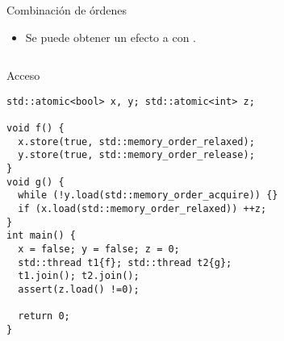 \begin{frame}[fragile]{Combinación de órdenes}
\begin{itemize}
\item Se puede obtener un efecto 
      a  con .
\end{itemize}
\begin{columns}

\begin{column}{.5\textwidth}
\begin{block}{Acceso}
\begin{lstlisting}[basicstyle=\tiny]
std::atomic<bool> x, y; std::atomic<int> z;

void f() {
  x.store(true, std::memory_order_relaxed);
  y.store(true, std::memory_order_release);
}
void g() {
  while (!y.load(std::memory_order_acquire)) {}
  if (x.load(std::memory_order_relaxed)) ++z;
}
int main() {
  x = false; y = false; z = 0;
  std::thread t1{f}; std::thread t2{g};
  t1.join(); t2.join();
  assert(z.load() !=0);

  return 0;
}
\end{lstlisting}
\end{block}
\end{column}

\begin{column}{.5\textwidth}

\end{column}

\end{columns}
\end{frame}

